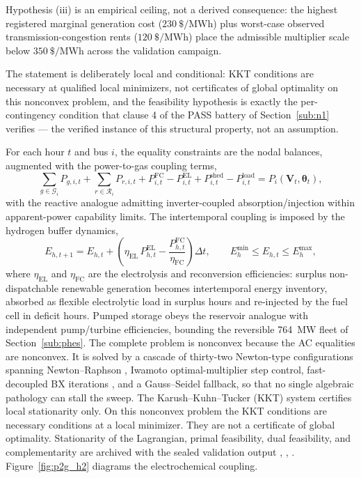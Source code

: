 Hypothesis (iii) is an empirical ceiling, not a derived consequence: the highest registered marginal generation cost ($230\ \text{\$}/\mathrm{MWh}$) plus worst-case observed transmission-congestion rents ($120\ \text{\$}/\mathrm{MWh}$) place the admissible multiplier scale below $350\ \text{\$}/\mathrm{MWh}$ across the validation campaign.

The statement is deliberately local and conditional: KKT conditions are necessary at qualified local minimizers, not certificates of global optimality on this nonconvex problem, and the feasibility hypothesis is exactly the per-contingency condition that clause 4 of the PASS battery of Section~\ref{sub:n1} verifies --- the verified instance of this structural property, not an assumption.

For each hour $t$ and bus $i$, the equality constraints are the nodal balances, augmented with the power-to-gas coupling terms,
\begin{equation}
\sum_{g \in \mathcal{G}_i} P_{g,i,t} + \sum_{r \in \mathcal{R}_i} P_{r,i,t} + P_{i,t}^{\mathrm{FC}} - P_{i,t}^{\mathrm{EL}} + P_{i,t}^{\mathrm{shed}} - P_{i,t}^{\mathrm{load}} = P_i(\mathbf{V}_t, \boldsymbol{\theta}_t),
\label{eq:opf_balance}
\end{equation}
with the reactive analogue admitting inverter-coupled absorption/injection within apparent-power capability limits. The intertemporal coupling is imposed by the hydrogen buffer dynamics,
\begin{equation}
E_{h,t+1} = E_{h,t} + \left(\eta_{\mathrm{EL}}\, P_{h,t}^{\mathrm{EL}} - \frac{P_{h,t}^{\mathrm{FC}}}{\eta_{\mathrm{FC}}}\right) \Delta t, \qquad E_h^{\min} \le E_{h,t} \le E_h^{\max},
\label{eq:h2_storage}
\end{equation}
where $\eta_{\mathrm{EL}}$ and $\eta_{\mathrm{FC}}$ are the electrolysis and reconversion efficiencies: surplus non-dispatchable renewable generation becomes intertemporal energy inventory, absorbed as flexible electrolytic load in surplus hours and re-injected by the fuel cell in deficit hours. Pumped storage obeys the reservoir analogue with independent pump/turbine efficiencies, bounding the reversible 764~MW fleet of Section~\ref{sub:phes}. The complete problem is nonconvex because the AC equalities are nonconvex. It is solved by a cascade of thirty-two Newton-type configurations spanning Newton--Raphson \cite{tinney1967}, Iwamoto optimal-multiplier step control, fast-decoupled BX iterations \cite{stott1974}, and a Gauss--Seidel fallback, so that no single algebraic pathology can stall the sweep. The Karush--Kuhn--Tucker (KKT) system certifies local stationarity only. On this nonconvex problem the KKT conditions are necessary conditions at a local minimizer. They are not a certificate of global optimality. Stationarity of the Lagrangian, primal feasibility, dual feasibility, and complementarity are archived with the sealed validation output \cite{nocedal2006}, \cite{dommel1968}, \cite{wood2013}. Figure~\ref{fig:p2g_h2} diagrams the electrochemical coupling.

